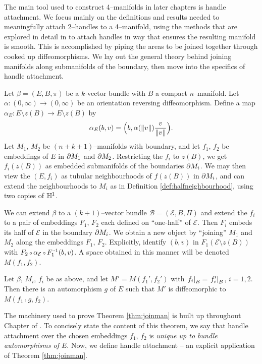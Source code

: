 The main tool used to construct 4--manifolds in later chapters is handle attachment.
We focus mainly on the definitions and results needed to meaningfully attach 2--handles to a 4--manifold, using the methods that are explored in detail in \cite{Kosi93} to attach handles in way that ensures the resulting manifold is smooth.
This is accomplished by piping the areas to be joined together through cooked up diffeomorphisms.
We lay out the general theory behind joining manifolds along submanifolds of the boundary, then move into the specifics of handle attachment.

Let $\beta=(E,B,\pi)$ be a $k$-vector bundle with $B$ a compact $n$--manifold.
Let $\alpha:(0,\infty)\to(0,\infty)$ be an orientation reversing diffeomorphism.
Define a map $\alpha_E: E\setminus z(B) \to E\setminus z(B)$ by
\begin{equation}
	\label{eqn:alpha}
	\alpha_E(b,v) = \Big(b,\alpha(\left\lVert v \right\rVert)\frac{v}{\left\lVert v \right\rVert}\Big).
\end{equation}
Let $M_1$, $M_2$ be $(n+k+1)$--manifolds with boundary, and let $f_1$, $f_2$ be embeddings of $E$ in $\partial M_1$ and $\partial M_2$.
Restricting the $f_i$ to $z(B)$, we get $f_i(z(B))$ as embedded submanifolds of the boundaries $\partial M_i$.
We may then view the $(E,f_i)$ as tubular neighbourhoods of $f(z(B))$ in $\partial M_i$, and can extend the neighbourhoods to $M_i$ as in Definition \ref{def:halfneighbourhood}, using two copies of $\mathbb{H}^1$.

We can extend $\beta$ to a $(k+1)$--vector bundle $\mathcal{B}=(\mathcal{E},B,\Pi)$ and extend the $f_i$ to a pair of embeddings $F_1$, $F_2$ each defined on ``one-half'' of $\mathcal{E}$.
Then $F_i$ embeds its half of $\mathcal{E}$ in the boundary $\partial M_i$.
We obtain a new object by ``joining'' $M_1$ and $M_2$ along the embeddings $F_1$, $F_2$.
Explicitly, identify $(b,v)$ in $F_1(\mathcal{E}\setminus z(B))$ with $F_2\comp \alpha_\mathcal{E}\comp F_1\inv(b,v)$.
A space obtained in this manner will be denoted $M(f_1,f_2)$.

\begin{theorem}
	\label{thm:joinman}
	Let $\beta$, $M_i$, $f_i$ be as above, and let $M'=M(f_1',f_2')$ with $\left.f_i\right|_{B}=\left.f_i'\right|_{B}$, $i=1,2$.
	Then there is an automorphism $g$ of $E$ such that $M'$ is diffeomorphic to $M(f_1\comp g,f_2)$.
\end{theorem}

The machinery used to prove Theorem \ref{thm:joinman} is built up throughout Chapter  of \cite{Kosi93}.
To concisely state the content of this theorem, we say that handle attachment over the chosen embeddings $f_1$, $f_2$ is \emph{unique up to bundle automorphisms of $E$}.
Now, we define handle attachment -- an explicit application of Theorem \ref{thm:joinman}.

